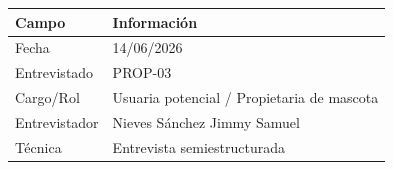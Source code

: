 \documentclass[journal,onecolumn]{IEEEtran}
\begin{document}
\begin{table}[H]
	\centering\small
	\begin{tabularx}{\textwidth}{@{}l X@{}}
		\toprule
		\textbf{Campo} & \textbf{Información} \\
		\midrule
		
		Fecha & 14/06/2026 \\
		
		Entrevistado & PROP-03 \\
		
		Cargo/Rol & Usuaria potencial / Propietaria de mascota \\
		
		Entrevistador & Nieves Sánchez Jimmy Samuel \\
		
		Técnica & Entrevista semiestructurada \\
		
		\bottomrule
	\end{tabularx}
\end{table}
\end{document}
